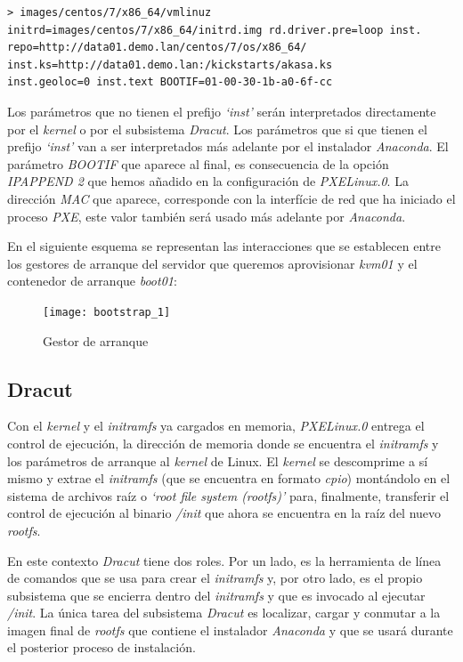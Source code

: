 \documentclass[a4paper,12pt,spanish,final]{epsc_tfc_pfc}
\begin{document}
\begin{lstlisting}[style=dnsmasq]
> images/centos/7/x86_64/vmlinuz initrd=images/centos/7/x86_64/initrd.img rd.driver.pre=loop inst.
repo=http://data01.demo.lan/centos/7/os/x86_64/ inst.ks=http://data01.demo.lan:/kickstarts/akasa.ks
inst.geoloc=0 inst.text BOOTIF=01-00-30-1b-a0-6f-cc
\end{lstlisting}

Los parámetros que no tienen el prefijo \emph{`inst'} serán interpretados directamente por el \emph{kernel} o por el subsistema \emph{Dracut}. Los parámetros que si que tienen el prefijo \emph{`inst'} van a ser interpretados más adelante por el instalador \emph{Anaconda}. El parámetro \emph{BOOTIF} que aparece al final, es consecuencia de la opción \emph{IPAPPEND 2} que hemos añadido en la configuración de \emph{PXELinux.0}. La dirección \emph{MAC} que aparece, corresponde con la interfície de red que ha iniciado el proceso \emph{PXE}, este valor también será usado más adelante por \emph{Anaconda}.

En el siguiente esquema se representan las interacciones que se establecen entre los gestores de arranque del servidor que queremos aprovisionar \emph{kvm01} y el contenedor de arranque \emph{boot01}:\\

\begin{figure}[h]
  \centering
    \texttt{[image: bootstrap\_1]}
      \caption{Gestor de arranque}
\end{figure}

\subsection{Dracut}
Con el \emph{kernel} y el \emph{initramfs} ya cargados en memoria, \emph{PXELinux.0} entrega el control de ejecución, la dirección de memoria donde se encuentra el \emph{initramfs} y los parámetros de arranque al \emph{kernel} de Linux. El \emph{kernel} se descomprime a sí mismo y extrae el \emph{initramfs} (que se encuentra en formato \emph{cpio}) montándolo en el sistema de archivos raíz o \emph{`root file system (rootfs)'} para, finalmente, transferir el control de ejecución al binario \emph{/init} que ahora se encuentra en la raíz del nuevo \emph{rootfs}.

En este contexto \emph{Dracut} tiene dos roles. Por un lado, es la herramienta de línea de comandos que se usa para crear el \emph{initramfs} y, por otro lado, es el propio subsistema que se encierra dentro del \emph{initramfs} y que es invocado al ejecutar \emph{/init}. La única tarea del subsistema \emph{Dracut} es localizar, cargar y conmutar a la imagen final de \emph{rootfs} que contiene el instalador \emph{Anaconda} y que se usará durante el posterior proceso de instalación.
\end{document}
